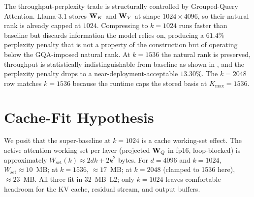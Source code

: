\documentclass[11pt]{article}
\begin{document}
The throughput-perplexity trade is structurally controlled by Grouped-Query
Attention. Llama-3.1 stores $\mathbf{W}_K$ and $\mathbf{W}_V$ at shape $1024\times4096$,
so their natural rank is already capped at $1024$. Compressing to $k{=}1024$
runs faster than baseline but discards information the model relies on,
producing a $61.4\%$ perplexity penalty that is not a property of the
construction but of operating below the GQA-imposed natural rank. At
$k{=}1536$ the natural rank is preserved, throughput is statistically
indistinguishable from baseline as shown in , and the
perplexity penalty drops to a near-deployment-acceptable $13.30\%$. The
$k{=}2048$ row matches $k{=}1536$ because the runtime caps the stored basis
at $K_\text{max}{=}1536$.

\section{Cache-Fit Hypothesis}
\label{sec:cachefit}
We posit that the super-baseline at $k{=}1024$ is a cache working-set effect.
The active attention working set per layer (projected $\mathbf{W}_Q$ in fp16,
loop-blocked) is approximately $W_\text{set}(k) \approx 2 d k\!+\!2 k^2$ bytes.
For $d{=}4096$ and $k{=}1024$, $W_\text{set}\!\approx\!10$~MB; at $k{=}1536$,
$\approx\!17$~MB; at $k{=}2048$ (clamped to 1536 here), $\approx\!23$~MB.  All
three fit in 32~MB~L2; only $k{=}1024$ leaves comfortable headroom for the KV
cache, residual stream, and output buffers.
\end{document}
